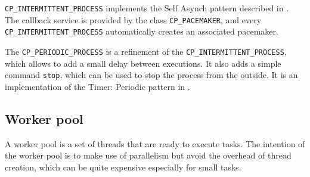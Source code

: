 \documentclass[a4paper,10pt]{report}
\begin{document}
\lstinline!CP_INTERMITTENT_PROCESS! implements the Self Asynch pattern described in .
The callback service is provided by the class \lstinline!CP_PACEMAKER!, and every \lstinline!CP_INTERMITTENT_PROCESS! automatically creates an associated pacemaker.

The \lstinline!CP_PERIODIC_PROCESS! is a refinement of the \lstinline!CP_INTERMITTENT_PROCESS!, which allows to add a small delay between executions.
It also adds a simple command \lstinline!stop!, which can be used to stop the process from the outside.
It is an implementation of the Timer: Periodic pattern in .

\subsection{Worker pool}

% 
% 
% 
% 
% 
% 

A worker pool is a set of threads that are ready to execute tasks.
The intention of the worker pool is to make use of parallelism but avoid the overhead of thread creation, which can be quite expensive especially for small tasks.
\end{document}
